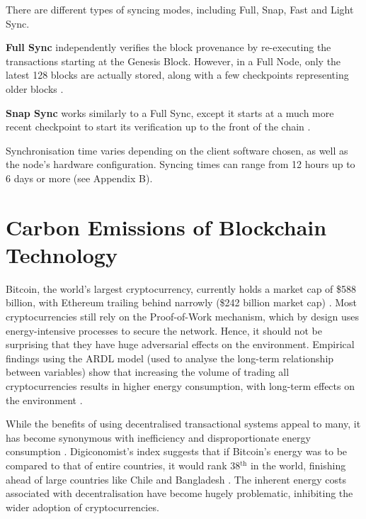 There are different types of syncing modes, including Full, Snap, Fast and Light Sync.

\textbf{Full Sync }independently verifies the block provenance by re-executing the transactions starting at the Genesis Block. However, in a Full Node, only the latest 128 blocks are actually stored, along with a few checkpoints representing older blocks \cite{EthereumEthereum.org}. 

\textbf{Snap Sync} works similarly to a Full Sync, except it starts at a much more recent checkpoint to start its verification up to the front of the chain \cite{2022DeveloperGo-ethereum}.

Synchronisation time varies depending on the client software chosen, as well as the node's hardware configuration. Syncing times can range from 12 hours up to 6 days or more (see Appendix B).



\section{Carbon Emissions of Blockchain Technology }

Bitcoin, the world's largest cryptocurrency, currently holds a market cap of \$588 billion, with Ethereum trailing behind narrowly (\$242 billion market cap) \cite{BitcoinCoinMarketCap}. Most cryptocurrencies still rely on the Proof-of-Work mechanism, which by design uses energy-intensive processes to secure the network. Hence, it should not be surprising that they have huge adversarial effects on the environment. Empirical findings using the ARDL model (used to analyse the long-term relationship between variables) show that increasing the volume of trading all cryptocurrencies results in higher energy consumption, with long-term effects on the environment \cite{Schinckus2020Crypto-currenciesConsumption}. 

While the benefits of using decentralised transactional systems appeal to many, it has become synonymous with inefficiency and disproportionate energy consumption \cite{DeVriesBitcoinsProblem}. Digiconomist's index suggests that if Bitcoin's energy was to be compared to that of entire countries, it would rank 38$\mathrm{^{th}}$ in the world, finishing ahead of large countries like Chile and Bangladesh \cite{BitcoinDigiconomist}. The inherent energy costs associated with decentralisation have become hugely problematic, inhibiting the wider adoption of cryptocurrencies. 

